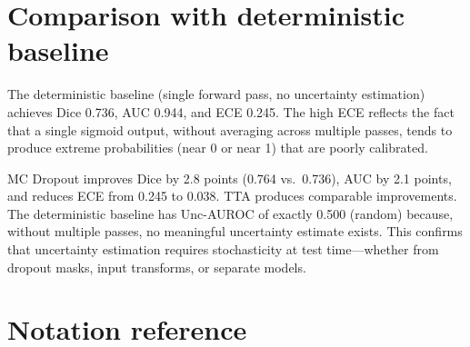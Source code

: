 \section{Comparison with deterministic baseline}
\label{app:deterministic}

The deterministic baseline (single forward pass, no uncertainty estimation)
achieves Dice 0.736, AUC 0.944, and ECE 0.245. The high ECE reflects the
fact that a single sigmoid output, without averaging across multiple
passes, tends to produce extreme probabilities (near 0 or near 1) that
are poorly calibrated.

MC Dropout improves Dice by 2.8 points (0.764 vs.\ 0.736), AUC by 2.1
points, and reduces ECE from 0.245 to 0.038. TTA produces comparable
improvements. The deterministic baseline has Unc-AUROC of exactly 0.500
(random) because, without multiple passes, no meaningful uncertainty
estimate exists. This confirms that uncertainty estimation requires
stochasticity at test time---whether from dropout masks, input transforms,
or separate models.

\section{Notation reference}
\label{app:notation}

